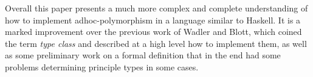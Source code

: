 \documentclass[a4paper,fleqn,notitlepage]{scrartcl}
\begin{document}
Overall this paper presents a much more complex and complete understanding of
how to implement adhoc-polymorphism in a language similar to Haskell. It is a
marked improvement over the previous work of Wadler and Blott, which coined the
term \textit{type class} and described at a high level how to implement them, as
well as some preliminary work on a formal definition that in the end had some
problems determining principle types in some cases.
\end{document}
